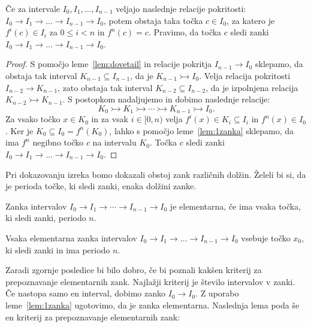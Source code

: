 \documentclass[../TG_magistrsko_delo_sections.tex]{subfiles}
\begin{document}
\begin{lema}\label{lem:zanka}
Če za intervale $I_0, I_1, \dots, I_{n-1}$ veljajo naslednje relacije pokritosti: $I_0 \to I_1 \to \dots \to I_{n-1} \to I_0$, potem obstaja taka točka $c \in I_0$, za katero je $f^{i}(c) \in I_i$ za $0 \leq i < n$ in $f^n(c)=c$. Pravimo, da točka $c$ sledi zanki $I_0 \to I_1 \to \dots \to I_{n-1} \to I_0$.
\end{lema}

\begin{proof}
S pomočjo leme~\ref{lem:dovetail} in relacije pokritja $I_{n-1} \to I_0$ sklepamo, da obstaja tak interval $K_{n-1} \subseteq I_{n-1}$, da je $K_{n-1} \rightarrowtail I_0$. Velja relacija pokritosti $I_{n-2} \to K_{n-1}$, zato obstaja tak interval $K_{n-2} \subseteq I_{n-2}$, da je izpolnjena relacija $K_{n-2} \rightarrowtail K_{n-1}$. S postopkom nadaljujemo in dobimo naslednje relacije:
$$K_0 \rightarrowtail K_1 \rightarrowtail \cdots \rightarrowtail K_{n-1} \rightarrowtail I_0.$$
Za vsako točko $x \in K_0$ in za vsak $i \in [0, n)$ velja $f^i(x) \in K_i \subseteq I_i$ in $f^n(x) \in I_0$. Ker je $K_0 \subseteq I_0 = f^n(K_0)$, lahko s pomočjo leme~\ref{lem:1zanka} sklepamo, da ima $f^n$ negibno točko $c$ na intervalu $K_0$. Točka $c$ sledi zanki $I_0 \to I_1 \to \dots \to I_{n-1} \to I_0$.
\end{proof}

Pri dokazovanju izreka bomo dokazali obstoj zank različnih dolžin. Želeli bi si, da je perioda točke, ki sledi zanki, enaka dolžini zanke. 

\begin{definicija}\label{def:element}
Zanka intervalov $I_0 \to I_1 \to \cdots \to I_{n-1} \to I_0$ je elementarna, če ima vsaka točka, ki sledi zanki, periodo $n$.
\end{definicija}

\begin{posledica}
Vsaka elementarna zanka intervalov $I_0 \to I_1 \to \dots \to I_{n-1} \to I_0$ vsebuje točko $x_0$, ki sledi zanki in ima periodo $n$.
\end{posledica}

Zaradi zgornje posledice bi bilo dobro, če bi poznali kakšen kriterij za prepoznavanje elementarnih zank. Najlažji kriterij je število intervalov v zanki. Če nastopa samo en interval, dobimo zanko $I_0 \to I_0$. Z uporabo leme~\ref{lem:1zanka} ugotovimo, da je zanka elementarna. Naslednja lema poda še en kriterij za prepoznavanje elementarnih zank:
\end{document}
